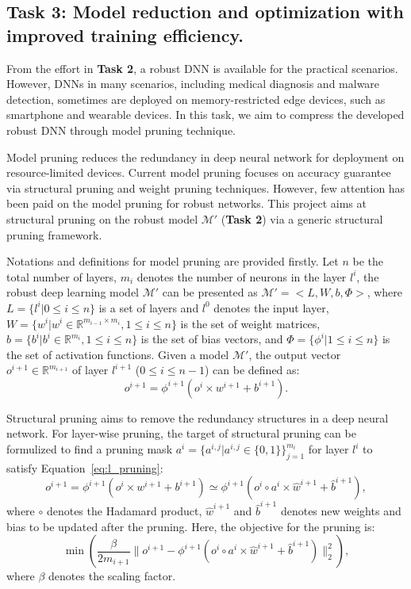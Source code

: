 \subsection{Task 3: Model reduction and optimization with improved training efficiency.}

From the effort in \textbf{Task 2}, a robust DNN is available for the practical scenarios. However, DNNs in many scenarios, including medical diagnosis and malware detection, sometimes are deployed on memory-restricted edge devices, such as smartphone and wearable devices. In this task, we aim to compress the developed robust DNN through model pruning technique. 

Model pruning reduces the redundancy in deep neural network for deployment on resource-limited devices. Current model pruning focuses on accuracy guarantee via structural pruning and weight pruning techniques. However, few attention has been paid on the model pruning for robust networks. This project aims at structural pruning on the robust model $\mathcal{M}'$ ({\textbf{Task 2}}) via a generic structural pruning framework. 

Notations and definitions for model pruning are provided firstly.  Let $n$ be the total number of layers, $m_i$ denotes the number of neurons in the layer $l^i$, the robust deep learning model $\mathcal{M}'$ can be presented as $\mathcal{M}'=<L, W, b, \Phi>$, where $L=\{ l^{i}|0\leq i\le n \}$ is a set of layers and $l^0$ denotes the input layer, $W=\{w^i|w^i\in\mathbb{R}^{m_{i-1}\times m_{i}}, 1\le i\le n \}$ is the set of weight matrices, $b=\{b^i|b^i\in\mathbb{R}^{m_i}, 1\le i\le n \}$ is the set of bias vectors, and $\Phi=\{\phi^i|1\le i\le n\}$ is the set of activation functions. Given a model $\mathcal{M}'$, the output vector $o^{i+1}\in\mathbb{R}^{m_{i+1}}$ of layer $l^{i+1}$ ($0\le i\le n-1$) can be defined as:
\begin{equation}
    o^{i+1} = \phi^{i+1}(o^{i}\times w^{i+1} + b^{i+1}).
\end{equation}

Structural pruning aims to remove the redundancy structures in a deep neural network. For layer-wise pruning, the target of structural pruning can be formulized to find a pruning mask $a^i=\{a^{i,j}|a^{i,j}\in\{0,1\}\}^{m_i}_{j=1}$ for layer $l^i$ to satisfy Equation~\eqref{eq:l_pruning}:
 \begin{equation}\label{eq:l_pruning}
 o^{i+1}=\phi^{i+1}(o^i\times w^{i+1}+b^{i+1})\simeq \phi^{i+1}(o^i\circ a^i\times \hat{w}^{i+1}+\hat{b}^{i+1}), 
 \end{equation}
 where $\circ$ denotes the Hadamard product, $\hat{w}^{i+1}$ and $\hat{b}^{i+1}$ denotes new weights and bias to be updated after the pruning. Here, the objective for the pruning is:
 \begin{equation}\label{eq:pruning_target}
     \min(\frac{\beta}{2m_{i+1}}\|o^{i+1} - \phi^{i+1}(o^i\circ a^i\times \hat{w}^{i+1}+\hat{b}^{i+1})\|^2_2),
 \end{equation}
 where $\beta$ denotes the scaling factor.
 
